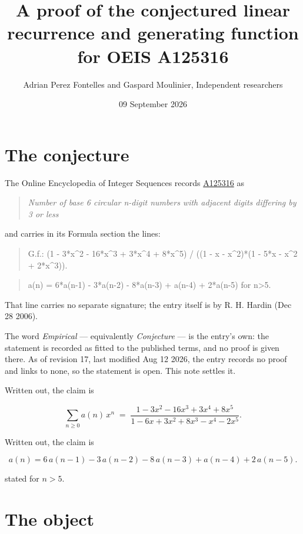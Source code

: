 \documentclass[11pt]{article}
\title{A proof of the conjectured linear recurrence and generating function for OEIS A125316}
\author{Adrian Perez Fontelles and Gaspard Moulinier, Independent researchers}
\date{09 September 2026}
\theoremstyle{definition}
\begin{document}
\maketitle
\section{The conjecture}

The Online Encyclopedia of Integer Sequences records \href{https://oeis.org/A125316}{A125316} as

\begin{quote}\itshape Number of base 6 circular n-digit numbers with adjacent digits differing by 3 or less\end{quote}

and carries in its Formula section the lines:

\begin{quote}\ttfamily G.f.: (1 - 3*x\textasciicircum{}2 - 16*x\textasciicircum{}3 + 3*x\textasciicircum{}4 + 8*x\textasciicircum{}5) / ((1 - x - x\textasciicircum{}2)*(1 - 5*x - x\textasciicircum{}2 + 2*x\textasciicircum{}3)).\end{quote}

\begin{quote}\ttfamily a(n) = 6*a(n-1) - 3*a(n-2) - 8*a(n-3) + a(n-4) + 2*a(n-5) for n>5.\end{quote}

That line carries no separate signature; the entry itself is by R. H. Hardin (Dec 28 2006).

The word {\itshape Empirical} --- equivalently {\itshape Conjecture} --- is the entry's own: the statement is recorded as fitted to the published terms, and no proof is given there. As of revision 17, last modified Aug 12 2026, the entry records no proof and links to none, so the statement is open. This note settles it.

Written out, the claim is

\[\sum_{n \ge 0} a(n)\,x^n \;=\; \frac{1 - 3x^{2} - 16x^{3} + 3x^{4} + 8x^{5}}{1 - 6x + 3x^{2} + 8x^{3} - x^{4} - 2x^{5}}.\]

Written out, the claim is

\[a(n) = 6\,a(n-1) - 3\,a(n-2) - 8\,a(n-3) + a(n-4) + 2\,a(n-5).\]

stated for $n > 5$.

\section{The object}
\end{document}
